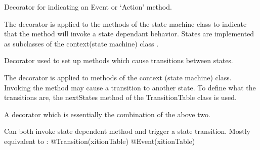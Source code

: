 \documentclass[letterpaper,10pt,english]{sphinxmanual}
\begin{document}

\begin{fulllineitems}
\label{enuActor:enuActor.DecoratorStateMachine.event}
Decorator for indicating an Event or `Action' method.

The decorator is applied to the methods of the state machine class to 
indicate that the method will invoke a state dependant behavior. States
are implemented as subclasses of the context(state machine) class .

\end{fulllineitems}


\begin{fulllineitems}
\label{enuActor:enuActor.DecoratorStateMachine.transition}
Decorator used to set up methods which cause transitions between states.

The decorator is applied to methods of the context (state machine) class. 
Invoking the method may cause a transition to another state.  To define
what the transitions are, the nextStates method of the TransitionTable class
is used.

\end{fulllineitems}


\begin{fulllineitems}
\label{enuActor:enuActor.DecoratorStateMachine.transitionevent}
A decorator which is essentially the combination of the above two.

Can both invoke state dependent method and trigger a state 
transition.  Mostly equivalent to :
@Transition(xitionTable)
@Event(xitionTable)

\end{fulllineitems}


\begin{fulllineitems}
\label{enuActor:enuActor.DecoratorStateMachine.truncated}
\end{fulllineitems}
\end{document}

